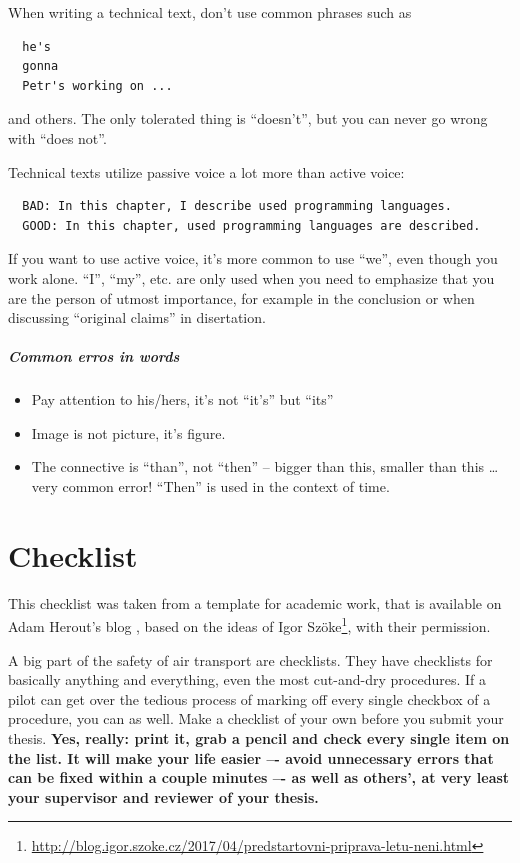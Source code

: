 When writing a technical text, don't use common phrases such as
\begin{verbatim}
  he's
  gonna
  Petr's working on ...
\end{verbatim}
\noindent and others. The only tolerated thing is ``doesn't'', but you can never go wrong with ``does not''.

\begin{samepage}
\noindent Technical texts utilize passive voice a lot more than active voice: 
\begin{verbatim}
  BAD: In this chapter, I describe used programming languages. 
  GOOD: In this chapter, used programming languages are described.
\end{verbatim}
\end{samepage}

If you want to use active voice, it's more common to use ``we'', even though you work alone. ``I'', ``my'', etc. are only used when you need to emphasize that you are the person of utmost importance, for example in the conclusion or when discussing ``original claims'' in disertation.


\paragraph{Common erros in words}

\begin{itemize}
  \item{Pay attention to his/hers, it's not ``it's'' but ``its''}
  \item{Image is not picture, it's figure.}
  \item{The connective is ``than'', not ``then'' -- bigger than this, smaller than this \ldots very common error! ``Then'' is used in the context of time.}
\end{itemize}


\chapter{Checklist}
\label{checklist}
This checklist was taken from a template for academic work, that is available on Adam Herout's blog \cite{Herout}, based on the ideas of Igor Szöke\footnote{\url{http://blog.igor.szoke.cz/2017/04/predstartovni-priprava-letu-neni.html}}, with their permission.

A big part of the safety of air transport are checklists. They have checklists for basically anything and everything, even the most cut-and-dry procedures. If a pilot can get over the tedious process of marking off every single checkbox of a procedure, you can as well. Make a checklist of your own before you submit your thesis. \bf Yes, really: \rm print it, grab a pencil and check every single item on the list. It will make your life easier –- avoid unnecessary errors that can be fixed within a couple minutes –- as well as others', at very least your supervisor and reviewer of your thesis.

